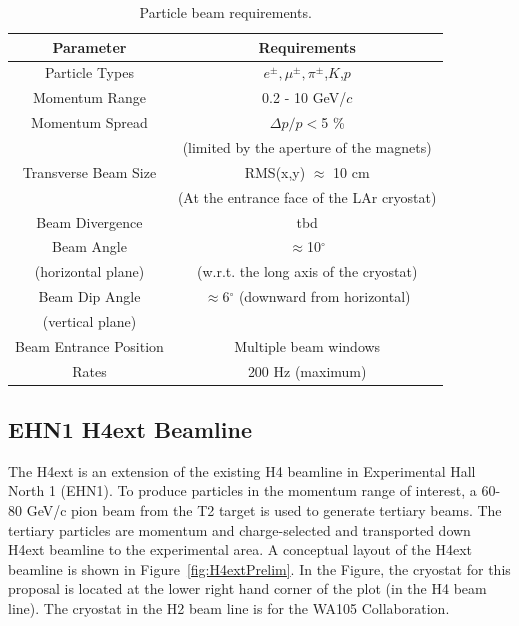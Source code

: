 %

\begin{table}[h]
\centering
\begin{tabular}{|c|c|}
\hline
\textbf{Parameter } & \textbf{Requirements}  \\ \hline
  Particle Types        & $e^\pm,\mu^\pm,\pi^\pm$,$K$,$p$  \\ \hline
  Momentum Range   & 0.2 - 10 GeV/$c$ \\ \hline
  Momentum Spread   & $\Delta p/p  < $5 \% \\
  & (limited by the aperture of the magnets)  \\ \hline
  Transverse Beam Size   & RMS(x,y) $\approx$ 10 cm  \\
  & (At the entrance face of the LAr cryostat) \\ \hline
  Beam Divergence & tbd   \\ \hline
  Beam Angle &  $\approx$10$^{\circ}$ \\
  (horizontal plane) &  (w.r.t. the long axis of the cryostat)\\ \hline
  Beam Dip Angle &  $\approx$6$^\circ$ (downward from horizontal)   \\ 
  (vertical plane) &  \\ \hline
  Beam Entrance Position & Multiple beam windows    \\ \hline
  Rates & 200 Hz (maximum)    \\ \hline
\end{tabular}
\caption{Particle beam requirements.}
\label{table:beamspecs}
\end{table}

\subsection{EHN1 H4ext Beamline}
The H4ext is an extension of the existing H4 beamline in Experimental Hall North 1 (EHN1).  To produce particles in the momentum range of interest, a 60-80 GeV/c pion beam from the T2 target is used to generate tertiary beams. The tertiary particles are momentum and charge-selected and transported down H4ext beamline to the experimental area. A conceptual layout of the H4ext beamline is shown in Figure~\ref{fig:H4extPrelim}.  In the Figure, the cryostat for this proposal is located at the lower right hand corner of the plot (in the H4 beam line). The cryostat in the H2 beam line is for the WA105 Collaboration.

